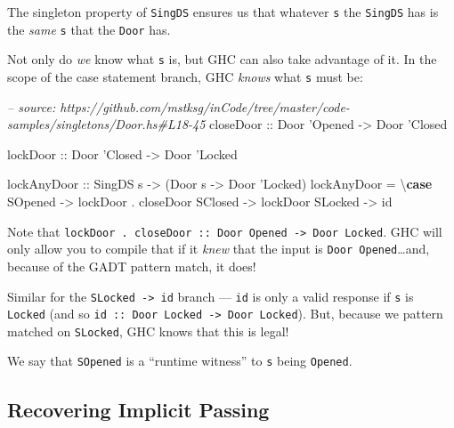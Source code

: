 \documentclass[]{article}
\newenvironment{Shaded}{}{}
\newcommand{\KeywordTok}[1]{\textcolor[rgb]{0.00,0.44,0.13}{\textbf{#1}}}
\newcommand{\DataTypeTok}[1]{\textcolor[rgb]{0.56,0.13,0.00}{#1}}
\newcommand{\CharTok}[1]{\textcolor[rgb]{0.25,0.44,0.63}{#1}}
\newcommand{\CommentTok}[1]{\textcolor[rgb]{0.38,0.63,0.69}{\textit{#1}}}
\newcommand{\OtherTok}[1]{\textcolor[rgb]{0.00,0.44,0.13}{#1}}
\newcommand{\FunctionTok}[1]{\textcolor[rgb]{0.02,0.16,0.49}{#1}}
\newcommand{\NormalTok}[1]{#1}
\begin{document}
The singleton property of \texttt{SingDS} ensures us that whatever \texttt{s}
the \texttt{SingDS} has is the \emph{same} \texttt{s} that the \texttt{Door}
has.

Not only do \emph{we} know what \texttt{s} is, but GHC can also take advantage
of it. In the scope of the case statement branch, GHC \emph{knows} what
\texttt{s} must be:

\begin{Shaded}
\begin{Highlighting}[]
\CommentTok{-- source: https://github.com/mstksg/inCode/tree/master/code-samples/singletons/Door.hs#L18-45}
\OtherTok{closeDoor ::} \DataTypeTok{Door} \CharTok{'Opened -> Door '}\DataTypeTok{Closed}

\OtherTok{lockDoor ::} \DataTypeTok{Door} \CharTok{'Closed -> Door '}\DataTypeTok{Locked}

\OtherTok{lockAnyDoor ::} \DataTypeTok{SingDS}\NormalTok{ s }\OtherTok{->}\NormalTok{ (}\DataTypeTok{Door}\NormalTok{ s }\OtherTok{->} \DataTypeTok{Door} \CharTok{'Locked)}
\NormalTok{lockAnyDoor }\FunctionTok{=}\NormalTok{ \textbackslash{}}\KeywordTok{case}
    \DataTypeTok{SOpened} \OtherTok{->}\NormalTok{ lockDoor }\FunctionTok{.}\NormalTok{ closeDoor}
    \DataTypeTok{SClosed} \OtherTok{->}\NormalTok{ lockDoor}
    \DataTypeTok{SLocked} \OtherTok{->}\NormalTok{ id}
\end{Highlighting}
\end{Shaded}

Note that
\texttt{lockDoor\ .\ closeDoor\ ::\ Door\ \textquotesingle{}Opened\ -\textgreater{}\ Door\ \textquotesingle{}Locked}.
GHC will only allow you to compile that if it \emph{knew} that the input is
\texttt{Door\ \textquotesingle{}Opened}\ldots{}and, because of the GADT pattern
match, it does!

Similar for the \texttt{SLocked\ -\textgreater{}\ id} branch --- \texttt{id} is
only a valid response if \texttt{s} is \texttt{\textquotesingle{}Locked} (and so
\texttt{id\ ::\ Door\ \textquotesingle{}Locked\ -\textgreater{}\ Door\ \textquotesingle{}Locked}).
But, because we pattern matched on \texttt{SLocked}, GHC knows that this is
legal!

We say that \texttt{SOpened} is a ``runtime witness'' to \texttt{s} being
\texttt{\textquotesingle{}Opened}.

\subsection{Recovering Implicit Passing}\label{recovering-implicit-passing}
\end{document}

